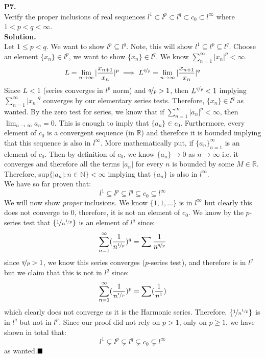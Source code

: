 \documentclass{article}
\begin{document}
    \textbf{P7.}\\

    Verify the proper inclusions of real sequences $l^1 \subset l^p \subset l^q \subset c_0 \subset l^{\infty}$ where
    $1 < p < q < \infty$.\\

    \textbf{Solution.}\\

    Let $1\leq p < q$. We want to show $l^p\subseteq l^q$. Note, this will show $l^1\subseteq l^p\subseteq l^q$. Choose
    an element $\{x_n\}\in l^p$, we want to show $\{x_n\}\in l^q$. 
    We know $\sum_{n=1}^{\infty} |x_n|^p < \infty$.
    \[ L = \lim_{n\to\infty} |\frac{x_{n+1}}{x_n}|^p \implies L^{\nicefrac{q}{p}} = \lim_{n\to\infty} |\frac{x_{n+1}}{x_n}|^q \]
    Since $L < 1$ (series converges in $l^p$ norm) and $\nicefrac{q}{p}>1$, then $L^{\nicefrac{q}{p}} < 1$ 
    implying $\sum_{n=1}^{\infty} |x_n|^q$ converges by our elementary series tests. Therefore, $\{x_n\}\in l^q$ as wanted.
    By the zero test for series, we know that if $\sum_{n=1}^{\infty} |a_n|^p < \infty$, then $\lim_{n\to\infty} a_n = 0$.
    This is enough to imply that $\{a_n\}\in c_0$. Furthermore, every element of $c_0$ is a convergent sequence (in $\mathbb{R}$)
    and therefore it is bounded implying that this sequence is also in $l^{\infty}$. More mathematically put,
    if $\{a_n\}_{n=1}^{\infty}$ is an element of $c_0$. Then by definition of $c_0$, we know $\{a_n\}\to 0$ as $n\to\infty$
    i.e. it converges and therefore all the terms $|a_n|$ for every $n$ is bounded by some $M\in\mathbb{R}$. Therefore,
    sup$\{|a_n|: n\in\mathbb{N}\} < \infty$ implying that $\{a_n\}$ is also in $l^{\infty}$.\\
    We have so far proven that:
    \[ l^1 \subseteq l^p \subseteq l^q \subseteq c_0 \subseteq l^{\infty} \]
    We will now show \textit{proper} inclusions. We know $\{1,1,\hdots\}$ is in $l^{\infty}$ but clearly this does not converge
    to 0, therefore, it is not an element of $c_0$. We know by the $p$-series test that $\{\nicefrac{1}{n^{\nicefrac{1}{p}}}\}$
    is an element of $l^q$ since:
    \[ \sum_{n=1}^{\infty} (\frac{1}{n^{\nicefrac{1}{p}}})^q = \sum \frac{1}{n^{\nicefrac{q}{p}}} \]
    since $\nicefrac{q}{p}>1$, we know this series converges ($p$-series test), and therefore is in $l^q$ but we claim that this
    is not in $l^q$ since:
    \[ \sum_{n=1}^{\infty} (\frac{1}{n^{\nicefrac{1}{p}}})^p = \sum (\frac{1}{n^1}) \]
    which clearly does not converge as it is the Harmonic series. Therefore, $\{\nicefrac{1}{n^{\nicefrac{1}{p}}}\}$ is in $l^q$
    but not in $l^p$. Since our proof did not rely on $p>1$, only on $p\geq 1$, we have shown in total that:
    \[ l^1 \subsetneq l^p \subsetneq l^q \subsetneq c_0 \subsetneq l^{\infty} \]
    as wanted.$\hfill\blacksquare$\\
\end{document}
